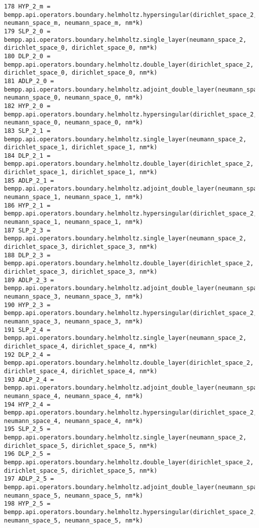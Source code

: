 \documentclass[12pt,letterpaper]{report}
\numberwithin{equation}{section}
\begin{document}
\begin{lstlisting}
178 HYP_2_m = bempp.api.operators.boundary.helmholtz.hypersingular(dirichlet_space_2, neumann_space_m, neumann_space_m, nm*k)
179 SLP_2_0 = bempp.api.operators.boundary.helmholtz.single_layer(neumann_space_2, dirichlet_space_0, dirichlet_space_0, nm*k)
180 DLP_2_0 = bempp.api.operators.boundary.helmholtz.double_layer(dirichlet_space_2, dirichlet_space_0, dirichlet_space_0, nm*k)
181 ADLP_2_0 = bempp.api.operators.boundary.helmholtz.adjoint_double_layer(neumann_space_2, neumann_space_0, neumann_space_0, nm*k)
182 HYP_2_0 = bempp.api.operators.boundary.helmholtz.hypersingular(dirichlet_space_2, neumann_space_0, neumann_space_0, nm*k)
183 SLP_2_1 = bempp.api.operators.boundary.helmholtz.single_layer(neumann_space_2, dirichlet_space_1, dirichlet_space_1, nm*k)
184 DLP_2_1 = bempp.api.operators.boundary.helmholtz.double_layer(dirichlet_space_2, dirichlet_space_1, dirichlet_space_1, nm*k)
185 ADLP_2_1 = bempp.api.operators.boundary.helmholtz.adjoint_double_layer(neumann_space_2, neumann_space_1, neumann_space_1, nm*k)
186 HYP_2_1 = bempp.api.operators.boundary.helmholtz.hypersingular(dirichlet_space_2, neumann_space_1, neumann_space_1, nm*k)
187 SLP_2_3 = bempp.api.operators.boundary.helmholtz.single_layer(neumann_space_2, dirichlet_space_3, dirichlet_space_3, nm*k)
188 DLP_2_3 = bempp.api.operators.boundary.helmholtz.double_layer(dirichlet_space_2, dirichlet_space_3, dirichlet_space_3, nm*k)
189 ADLP_2_3 = bempp.api.operators.boundary.helmholtz.adjoint_double_layer(neumann_space_2, neumann_space_3, neumann_space_3, nm*k)
190 HYP_2_3 = bempp.api.operators.boundary.helmholtz.hypersingular(dirichlet_space_2, neumann_space_3, neumann_space_3, nm*k)
191 SLP_2_4 = bempp.api.operators.boundary.helmholtz.single_layer(neumann_space_2, dirichlet_space_4, dirichlet_space_4, nm*k)
192 DLP_2_4 = bempp.api.operators.boundary.helmholtz.double_layer(dirichlet_space_2, dirichlet_space_4, dirichlet_space_4, nm*k)
193 ADLP_2_4 = bempp.api.operators.boundary.helmholtz.adjoint_double_layer(neumann_space_2, neumann_space_4, neumann_space_4, nm*k)
194 HYP_2_4 = bempp.api.operators.boundary.helmholtz.hypersingular(dirichlet_space_2, neumann_space_4, neumann_space_4, nm*k)
195 SLP_2_5 = bempp.api.operators.boundary.helmholtz.single_layer(neumann_space_2, dirichlet_space_5, dirichlet_space_5, nm*k)
196 DLP_2_5 = bempp.api.operators.boundary.helmholtz.double_layer(dirichlet_space_2, dirichlet_space_5, dirichlet_space_5, nm*k)
197 ADLP_2_5 = bempp.api.operators.boundary.helmholtz.adjoint_double_layer(neumann_space_2, neumann_space_5, neumann_space_5, nm*k)
198 HYP_2_5 = bempp.api.operators.boundary.helmholtz.hypersingular(dirichlet_space_2, neumann_space_5, neumann_space_5, nm*k)

\end{lstlisting}
\end{document}
